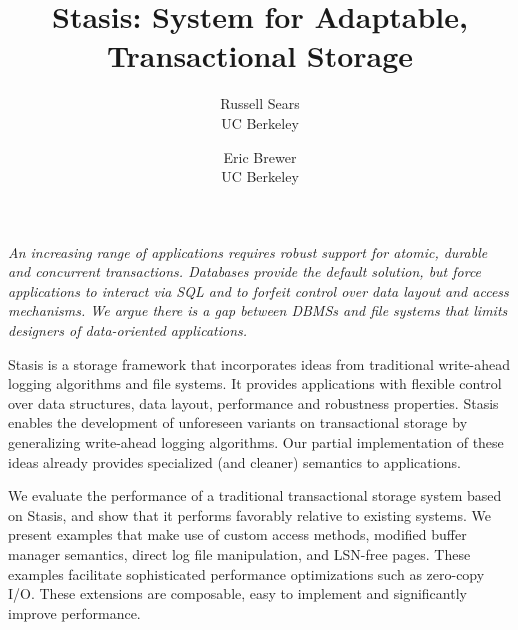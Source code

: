 \documentclass[letterpaper,twocolumn,10pt]{article}
\newcommand{\yad}{Stasis\xspace}
\begin{document}
\date{}


\title{\Large \bf \yad: System for Adaptable, Transactional Storage}

\author{
{\rm Russell Sears}\\
UC Berkeley
\and
{\rm Eric Brewer}\\
UC Berkeley
} %

\maketitle




{\em An increasing range of applications requires robust support for atomic, durable and concurrent
transactions.  Databases provide the default solution, but force
applications to interact via SQL and to forfeit control over data
layout and access mechanisms.  We argue there is a gap between DBMSs and file systems that limits designers of data-oriented applications.

\yad is a storage framework that incorporates ideas from traditional
write-ahead logging algorithms and file systems.
It provides applications with flexible control over data structures, data layout, performance and robustness properties.
\yad enables the development of
unforeseen variants on transactional storage by generalizing
write-ahead logging algorithms.  Our partial implementation of these
ideas already provides specialized (and cleaner) semantics to applications.

We evaluate the performance of a traditional transactional storage
system based on \yad, and show that it performs favorably relative to existing
systems.  We present examples that make use of custom access methods, modified
buffer manager semantics, direct log file manipulation, and LSN-free
pages.  These examples facilitate sophisticated performance 
optimizations such as zero-copy I/O.  These extensions are composable,
easy to implement and significantly improve performance.

}
\end{document}

